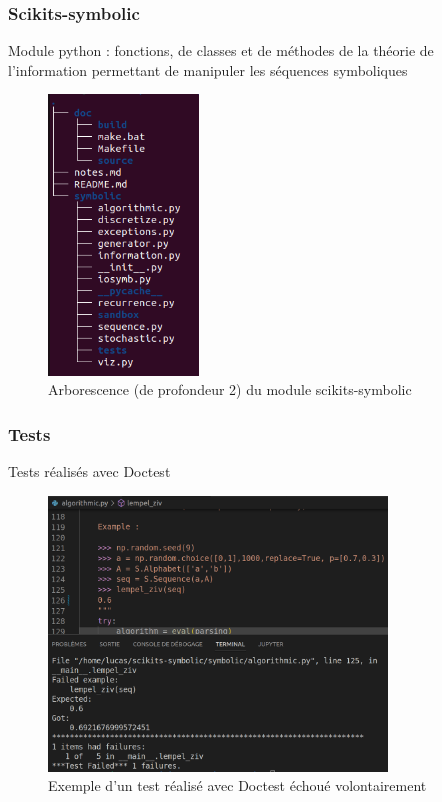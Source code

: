 \documentclass{beamer}
\begin{document}
\begin{frame}
\frametitle{Scikits-symbolic}
Module python : fonctions, de classes et de méthodes de la théorie de l'information permettant de manipuler les séquences symboliques

\begin{figure}[!ht]
    \centering
    \includegraphics[width=4cm]{arborescence.png}
    \caption{Arborescence (de profondeur 2) du module scikits-symbolic}
    \label{fig5.1}
\end{figure}
\end{frame}

\begin{frame}
\frametitle{Tests}
Tests réalisés avec Doctest
\begin{figure}[!ht]
    \centering
    \includegraphics[width=09cm]{exemple_doctest.png}
    \caption{Exemple d'un test réalisé avec Doctest échoué volontairement}
    \label{fig5.3}
\end{figure}
\end{frame}
\end{document}
